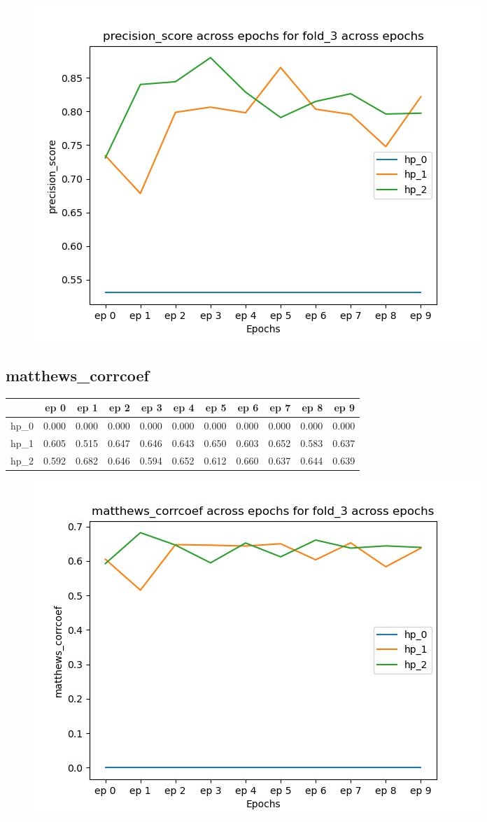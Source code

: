 \documentclass{article}
\begin{document}
\begin{figure}[H]
\includegraphics[scale = 0.75]{fold_3/precision_score}
\end{figure}
\subsection{matthews\_corrcoef}
\begin{tabular}{lrrrrrrrrrr}
\toprule
{} &   ep 0 &   ep 1 &   ep 2 &   ep 3 &   ep 4 &   ep 5 &   ep 6 &   ep 7 &   ep 8 &   ep 9 \\
\midrule
hp\_0 &  0.000 &  0.000 &  0.000 &  0.000 &  0.000 &  0.000 &  0.000 &  0.000 &  0.000 &  0.000 \\
hp\_1 &  0.605 &  0.515 &  0.647 &  0.646 &  0.643 &  0.650 &  0.603 &  0.652 &  0.583 &  0.637 \\
hp\_2 &  0.592 &  0.682 &  0.646 &  0.594 &  0.652 &  0.612 &  0.660 &  0.637 &  0.644 &  0.639 \\
\bottomrule
\end{tabular}

\begin{figure}[H]
\includegraphics[scale = 0.75]{fold_3/matthews_corrcoef}
\end{figure}
\end{document}
